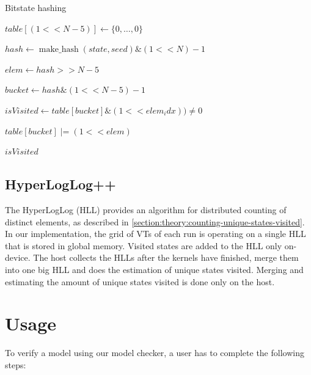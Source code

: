 \documentclass[
fancyheadings, %
%
%
]{stsreprt}
\DeclareMathOperator{\markVisited}{mark\_visited}
\begin{document}
\begin{algorithm}
    \caption{Bitstate hashing}
    \label{alg:bitstate-hashing}
    \begin{algorithmic}
        \State $table[(1 << N - 5)] \gets \{0, \dots, 0\}$

        \State

        \Function{$\markVisited$}{state}
        \State $hash \gets \operatorname{make\_hash}(state, seed) \mathbin{\text{\&}} (1 << N) - 1$

        \State $elem \gets hash >> N - 5$

        \State $bucket \gets hash \mathbin{\text{\&}} (1 << N - 5) - 1$

        \State $isVisited \gets table[bucket] \mathbin{\text{\&}} (1 << elem_idx)) \neq 0$

        \State $table[bucket] \mathbin{\text{|=}} (1 << elem)$

        \State

        \State \Return $isVisited$
        \EndFunction
    \end{algorithmic}
\end{algorithm}

\subsection{HyperLogLog++}

The HyperLogLog (HLL) provides an algorithm for distributed counting of distinct elements, as described in \cref{section:theory:counting-unique-states-visited}.
In our implementation, the grid of VTs of each run is operating on a single HLL that is stored in global memory.
Visited states are added to the HLL only on-device.
The host collects the HLLs after the kernels have finished, merge them into one big HLL and does the estimation of unique states visited.
Merging and estimating the amount of unique states visited is done only on the host.

\section{Usage}
\label{section:implementation:usage}

To verify a model using our model checker, a user has to complete the following steps:
\end{document}
